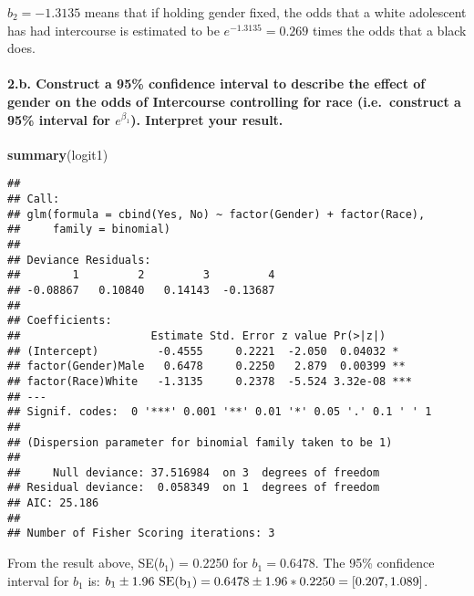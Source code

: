 \documentclass[]{article}
\newenvironment{Shaded}{\begin{snugshade}}{\end{snugshade}}
\newcommand{\KeywordTok}[1]{\textcolor[rgb]{0.13,0.29,0.53}{\textbf{#1}}}
\newcommand{\NormalTok}[1]{#1}
\let\oldparagraph\paragraph
\renewcommand{\paragraph}[1]{\oldparagraph{#1}\mbox{}}
\begin{document}
\(b_2 = -1.3135\) means that if holding gender fixed, the odds that a
white adolescent has had intercourse is estimated to be
\(e^{-1.3135} = 0.269\) times the odds that a black does.

\hypertarget{b.-construct-a-95-confidence-interval-to-describe-the-effect-of-gender-on-the-odds-of-intercourse-controlling-for-race-i.e.-construct-a-95-interval-for-ebeta_1.-interpret-your-result.}{%
\paragraph{\texorpdfstring{2.b. Construct a 95\% confidence interval to
describe the effect of gender on the odds of Intercourse controlling for
race (i.e.~construct a 95\% interval for \(e^{\beta_1}\)). Interpret
your
result.}{2.b. Construct a 95\% confidence interval to describe the effect of gender on the odds of Intercourse controlling for race (i.e.~construct a 95\% interval for e\^{}\{\textbackslash{}beta\_1\}). Interpret your result.}}\label{b.-construct-a-95-confidence-interval-to-describe-the-effect-of-gender-on-the-odds-of-intercourse-controlling-for-race-i.e.-construct-a-95-interval-for-ebeta_1.-interpret-your-result.}}

\begin{Shaded}
\begin{Highlighting}[]
\KeywordTok{summary}\NormalTok{(logit1)}
\end{Highlighting}
\end{Shaded}

\begin{verbatim}
## 
## Call:
## glm(formula = cbind(Yes, No) ~ factor(Gender) + factor(Race), 
##     family = binomial)
## 
## Deviance Residuals: 
##        1         2         3         4  
## -0.08867   0.10840   0.14143  -0.13687  
## 
## Coefficients:
##                    Estimate Std. Error z value Pr(>|z|)    
## (Intercept)         -0.4555     0.2221  -2.050  0.04032 *  
## factor(Gender)Male   0.6478     0.2250   2.879  0.00399 ** 
## factor(Race)White   -1.3135     0.2378  -5.524 3.32e-08 ***
## ---
## Signif. codes:  0 '***' 0.001 '**' 0.01 '*' 0.05 '.' 0.1 ' ' 1
## 
## (Dispersion parameter for binomial family taken to be 1)
## 
##     Null deviance: 37.516984  on 3  degrees of freedom
## Residual deviance:  0.058349  on 1  degrees of freedom
## AIC: 25.186
## 
## Number of Fisher Scoring iterations: 3
\end{verbatim}

From the result above, SE(\(b_1\)) = 0.2250 for \(b_1 = 0.6478\). The
95\% confidence interval for \(b_1\) is:
\(b_1 \pm 1.96\ \rm{SE}(b_1) = 0.6478 \pm 1.96*0.2250 = [0.207, 1.089]\).
\end{document}
